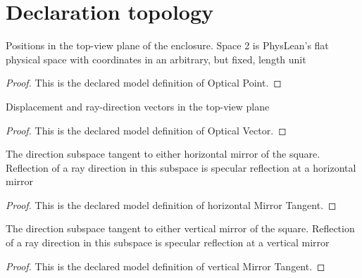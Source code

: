 \section{Declaration topology}
\begin{definition}
  \label{def:physics:phyx-mini-0024:phyxminiproblems-problemphyxmini0024-opticalpoint}
  Positions in the top-view plane of the enclosure. Space 2 is PhysLean's flat physical space with coordinates in an arbitrary, but fixed, length unit
\end{definition}
\begin{proof}
  This is the declared model definition of Optical Point.
\end{proof}
\begin{definition}
  \label{def:physics:phyx-mini-0024:phyxminiproblems-problemphyxmini0024-opticalvector}
  Displacement and ray-direction vectors in the top-view plane
\end{definition}
\begin{proof}
  This is the declared model definition of Optical Vector.
\end{proof}
\begin{definition}
  \label{def:physics:phyx-mini-0024:phyxminiproblems-problemphyxmini0024-horizontalmirrortangent}
  The direction subspace tangent to either horizontal mirror of the square. Reflection of a ray direction in this subspace is specular reflection at a horizontal mirror
\end{definition}
\begin{proof}
  This is the declared model definition of horizontal Mirror Tangent.
\end{proof}
\begin{definition}
  \label{def:physics:phyx-mini-0024:phyxminiproblems-problemphyxmini0024-verticalmirrortangent}
  The direction subspace tangent to either vertical mirror of the square. Reflection of a ray direction in this subspace is specular reflection at a vertical mirror
\end{definition}
\begin{proof}
  This is the declared model definition of vertical Mirror Tangent.
\end{proof}
